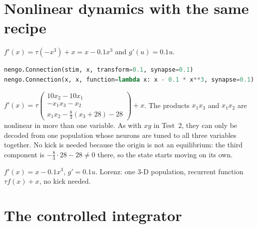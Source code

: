 \documentclass[11pt,letterpaper]{article}
\newcommand{\ans}[1]{\par\vspace{4pt}{\bfseries #1}\quad}
\begin{document}
\section{Nonlinear dynamics with the same recipe}

\ans{Q1}
$f'(x) = \tau(-x^3) + x = x - 0.1x^3$ and $g'(u) = 0.1u$.
\begin{lstlisting}[language=Python]
nengo.Connection(stim, x, transform=0.1, synapse=0.1)
nengo.Connection(x, x, function=lambda x: x - 0.1 * x**3, synapse=0.1)
\end{lstlisting}

\ans{Q2}
$f'(x) = \tau\begin{pmatrix} 10x_2 - 10x_1 \\ -x_1x_3 - x_2 \\ x_1x_2 - \tfrac83(x_3 + 28) - 28 \end{pmatrix} + x$.
The products $x_1x_3$ and $x_1x_2$ are nonlinear in more than one variable. As with $xy$ in Test~2, they can only be decoded from one population whose neurons are tuned to all three variables together. No kick is needed because the origin is not an equilibrium: the third component is $-\tfrac83\cdot28 - 28 \ne 0$ there, so the state starts moving on its own.
\begin{result}
$f'(x) = x - 0.1x^3$, $g' = 0.1u$. Lorenz: one 3-D population, recurrent function $\tau f(x) + x$, no kick needed.
\end{result}

\section{The controlled integrator}
\end{document}

